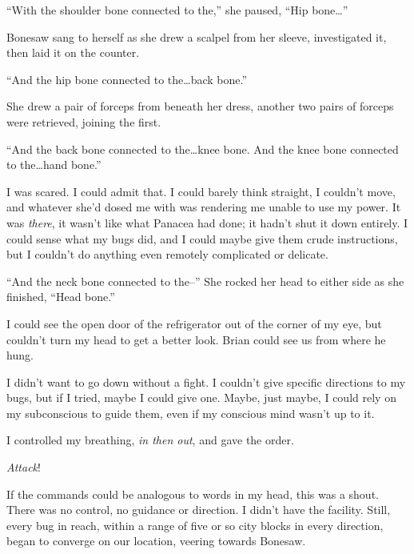 





``With the shoulder bone connected to the,'' she paused, ``Hip bone\ldots''



Bonesaw sang to herself as she drew a scalpel from her sleeve, investigated it, then laid it on the counter.



``And the hip bone connected to the\ldots back bone.''



She drew a pair of forceps from beneath her dress, another two pairs of forceps were retrieved, joining the first.



``And the back bone connected to the\ldots knee bone.  And the knee bone connected to the\ldots hand bone.''



I was scared.  I could admit that.  I could barely think straight, I couldn't move, and whatever she'd dosed me with was rendering me unable to use my power.  It was \emph{there}, it wasn't like what Panacea had done; it hadn't shut it down entirely.  I could sense what my bugs did, and I could maybe give them crude instructions, but I couldn't do anything even remotely complicated or delicate.



``And the neck bone connected to the--'' She rocked her head to either side as she finished, ``Head bone.''



I could see the open door of the refrigerator out of the corner of my eye, but couldn't turn my head to get a better look.  Brian could see us from where he hung.



I didn't want to go down without a fight.  I couldn't give specific directions to my bugs, but if I tried, maybe I could give one.  Maybe, just maybe, I could rely on my subconscious to guide them, even if my conscious mind wasn't up to it.



I controlled my breathing, \emph{in then out}, and gave the order.



\emph{Attack}!



If the commands could be analogous to words in my head, this was a shout.  There was no control, no guidance or direction.  I didn't have the facility.  Still, every bug in reach, within a range of five or so city blocks in every direction, began to converge on our location, veering towards Bonesaw.



